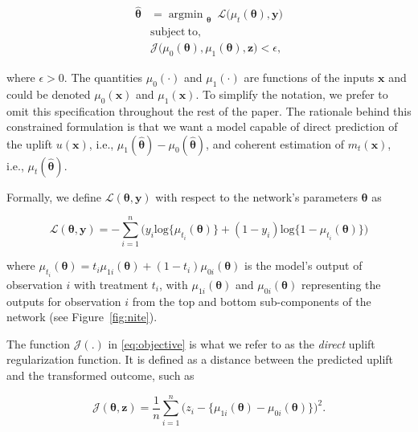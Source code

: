 \documentclass{article}
\def\z{\mathbf z}
\def\x{\mathbf x}
\def\y{\mathbf y}
\DeclareMathOperator*{\argmin}{argmin~} %
\begin{document}
\begin{align} 
     {\boldsymbol{\hat\theta}} & = \argmin_{\boldsymbol{\theta}} ~  \mathcal{L}\Big({\mu_t}(\boldsymbol{\theta}), \y\Big) \nonumber \\ 
     & \mathrm{subject~to,} \nonumber \\
        & \mathcal{J}\Big({\mu_0}(\boldsymbol{\theta}),{\mu_1}(\boldsymbol{\theta}), \z\Big) < \epsilon,
     \label{eq:objective}
\end{align}

where $\epsilon > 0$. The quantities $\mu_{0}(\cdot)$ and $\mu_{1}(\cdot)$ are functions of the inputs $\x$ and could be denoted $\mu_{0}(\x)$ and $\mu_{1}(\x)$. To simplify the notation, we prefer to omit this specification throughout the rest of the paper. The rationale behind this constrained formulation is that we want a model capable of direct prediction of the uplift $u(\x)$, i.e., $\mu_1(\boldsymbol{\hat\theta}) - \mu_0(\boldsymbol{\hat\theta})$, and coherent estimation of $m_t(\x)$, i.e., $\mu_t(\boldsymbol{\hat\theta})$. 

Formally, we define $\mathcal{L}(\boldsymbol{\theta}, \y)$ with respect to the network's parameters $\boldsymbol{\theta}$ as 

\begin{equation*}
    \mathcal{L}(\boldsymbol{\theta}, \y) = - \sum_{i=1}^{n} \Big( y_i\mathrm{log} \{\mu_{t_i}(\boldsymbol{\theta})\} + (1-y_i) \mathrm{log} \{1-\mu_{t_i}(\boldsymbol{\theta})\} \Big)
\end{equation*}

where $\mu_{t_i}(\boldsymbol{\theta}) = t_i \mu_{1i}(\boldsymbol{\theta}) + (1-t_i) \mu_{0i}(\boldsymbol{\theta})$ is the model's output of observation $i$ with treatment $t_i$, with $\mu_{1i}(\boldsymbol{\theta})$ and $\mu_{0i}(\boldsymbol{\theta})$  representing the outputs for observation $i$ from the top and bottom sub-components of the network (see Figure~\ref{fig:nite}).

The function $\mathcal{J}(.)$ in \eqref{eq:objective} is what we refer to as the \textit{direct} uplift regularization function. It is defined as a distance between the predicted uplift and the transformed outcome, such as

\begin{equation}
    \mathcal{J}(\boldsymbol{\theta}, \z) =   \frac{1}{n} \sum_{i=1}^{n} \Big( z_i - \{{\mu_{1i}}(\boldsymbol{\theta }) - {\mu_{0i}}(\boldsymbol{\theta})\} \Big)^2.
    \label{eq:direct_uplift_loss}
\end{equation}
\end{document}
